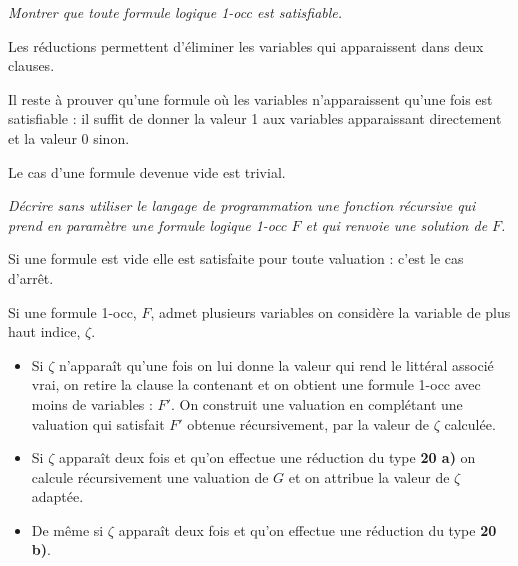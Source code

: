 \begin{Exercise}\it
Montrer que toute formule logique 1-occ est satisfiable.
\end{Exercise}
\begin{Answer}

Les réductions permettent d'éliminer les variables qui apparaissent dans deux clauses. 

Il reste à prouver qu'une  formule où les variables n'apparaissent qu'une fois est satisfiable : il suffit de donner la valeur 1 aux variables apparaissant directement et la valeur 0 sinon. 

Le cas d'une formule devenue vide est trivial.
\end{Answer}
\begin{Exercise}\it
 Décrire sans utiliser le langage de programmation une fonction récursive  qui prend en paramètre une formule logique 1-occ $F$ et qui renvoie une solution de $F$.
\end{Exercise}
\begin{Answer}

Si une formule est vide elle est satisfaite pour toute valuation : c'est le cas d'arrêt.

Si une formule 1-occ, $F$, admet plusieurs variables on considère la variable de plus haut indice, $\zeta$.

\begin{itemize}
  \item Si $\zeta$ n’apparaît qu'une fois on lui donne la valeur qui rend le littéral associé vrai, on retire la clause la contenant et on obtient une formule 1-occ avec moins de variables : $F'$. On construit une valuation en complétant une valuation qui satisfait $F'$ obtenue récursivement, par la valeur de $\zeta$ calculée.
  
  \item Si $\zeta$ apparaît deux fois et qu'on effectue une réduction du type {\bf 20 a)} on calcule récursivement une valuation de $G$ et on attribue la valeur de $\zeta$ adaptée.
  
  \item De même si $\zeta$ apparaît deux fois et qu'on effectue une réduction du type {\bf 20 b)}.
\end{itemize}
\end{Answer}
